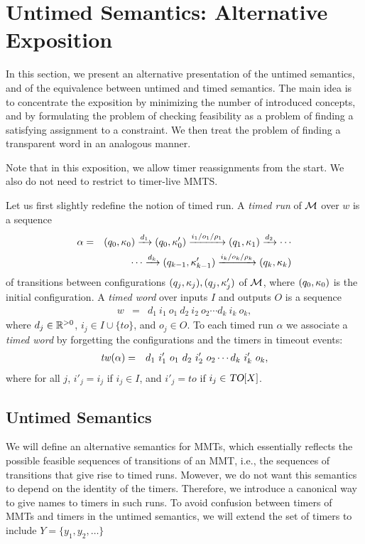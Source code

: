 \section{Untimed Semantics: Alternative Exposition}
\label{section constraints}
In this section, we present an alternative presentation of the untimed
semantics, and of the
equivalence between untimed and timed semantics. The main idea is to concentrate
the exposition by minimizing the number of introduced concepts, and
by formulating the problem of checking feasibility as a problem
of finding a satisfying assignment to a constraint. We then treat the problem
of finding a transparent word in an analogous manner.

Note that in this exposition, we allow timer reassignments from the start.
We also do not need to restrict to timer-live MMTS.

Let us first slightly redefine the notion of timed run.
A \emph{timed run} of ${\mathcal M}$ over $w$ is a sequence 
\begin{eqnarray*}
\alpha & = & (q_0,\kappa_0) \xrightarrow{d_1} (q_0,\kappa_0') \xrightarrow{i_1/o_1/\rho_1} (q_1,\kappa_1) \xrightarrow{d_2} 
\cdots
\\ && \qquad \cdots
\xrightarrow{d_k} (q_{k-1},\kappa_{k-1}') \xrightarrow{i_k/o_k/\rho_k} (q_k,\kappa_k)
\end{eqnarray*}
of transitions between configurations $(q_j,\kappa_j),(q_j,\kappa_j')$ of ${\mathcal M}$, where $(q_0,\kappa_0)$ is the initial configuration.
A \emph{timed word} over inputs $I$ and outputs $O$ is a sequence
\begin{eqnarray*}
w & = &  d_1 ~ i_1 ~ o_1 ~ d_2 ~ i_2 ~ o_2 \cdots d_k ~ i_k ~ o_k,
\end{eqnarray*}
where $d_j \in {\mathbb R}^{> 0}$, $i_j \in I \cup \{ \mathit{to} \}$, and $o_j \in O$.
To each timed run $\alpha$ we associate a \emph{timed word} by forgetting the configurations and the timers
in timeout events:
\begin{eqnarray*}
\mathit{tw}(\alpha) & = & d_1 ~ i'_1 ~ o_1 ~ d_2 ~ i'_2 ~ o_2 \cdots d_k ~ i'_k ~ o_k,
\end{eqnarray*}
where for all  $j$,
$i'_j   =   i_j$ if $i_j \in I$, and
$i'_j   = \mathit{to}$ if $i_j \in \mbox{\sl TO}[X]$.

\subsection{Untimed Semantics}
We will define an alternative semantics for MMTs, which essentially reflects the
possible feasible sequences of transitions of an MMT, i.e., the sequences of
transitions that give rise to timed runs.
Mowever, we do not want this semantics to
depend on the identity of the timers. Therefore, we introduce a canonical way to
give names to timers in such runs. To avoid confusion between timers of MMTs
and timers in the untimed semantics, we will extend the set of timers
to include $Y = \{ y_1, y_2,\ldots \}$

